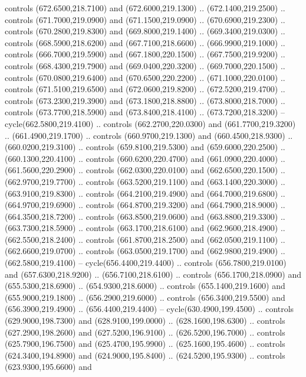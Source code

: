 {\begin{scope}[y=0.80pt, x=0.80pt, yscale=-1, xscale=1, inner sep=0pt, outer sep=0pt, #1]
      controls (672.6500,218.7100) and (672.6000,219.1300) .. (672.1400,219.2500) ..
      controls (671.7000,219.0900) and (671.1500,219.0900) .. (670.6900,219.2300) ..
      controls (670.2800,219.8300) and (669.8000,219.1400) .. (669.3400,219.0300) ..
      controls (668.5900,218.6200) and (667.7100,218.6600) .. (666.9900,219.1000) ..
      controls (666.7000,219.5900) and (667.1800,220.1500) .. (667.7500,219.9200) ..
      controls (668.4300,219.7900) and (669.0400,220.3200) .. (669.7000,220.1500) ..
      controls (670.0800,219.6400) and (670.6500,220.2200) .. (671.1000,220.0100) ..
      controls (671.5100,219.6500) and (672.0600,219.8200) .. (672.5200,219.4700) ..
      controls (673.2300,219.3900) and (673.1800,218.8800) .. (673.8000,218.7000) ..
      controls (673.7700,218.5900) and (673.8400,218.4100) .. (673.7200,218.3200) --
      cycle(662.5800,219.4100) .. controls (662.2700,220.0300) and
      (661.7700,219.3200) .. (661.4900,219.1700) .. controls (660.9700,219.1300) and
      (660.4500,218.9300) .. (660.0200,219.3100) .. controls (659.8100,219.5300) and
      (659.6000,220.2500) .. (660.1300,220.4100) .. controls (660.6200,220.4700) and
      (661.0900,220.4000) .. (661.5600,220.2900) .. controls (662.0300,220.0100) and
      (662.6500,220.1500) .. (662.9700,219.7700) .. controls (663.5200,219.1100) and
      (663.1400,220.3000) .. (663.9100,219.8300) .. controls (664.2100,219.4900) and
      (664.7000,219.6800) .. (664.9700,219.6900) .. controls (664.8700,219.3200) and
      (664.7900,218.9000) .. (664.3500,218.7200) .. controls (663.8500,219.0600) and
      (663.8800,219.3300) .. (663.7300,218.5900) .. controls (663.1700,218.6100) and
      (662.9600,218.4900) .. (662.5500,218.2400) .. controls (661.8700,218.2500) and
      (662.0500,219.1100) .. (662.6600,219.0700) .. controls (663.0500,219.1700) and
      (662.9800,219.4900) .. (662.5800,219.4100) -- cycle(656.4400,219.4400) ..
      controls (656.7800,219.0100) and (657.6300,218.9200) .. (656.7100,218.6100) ..
      controls (656.1700,218.0900) and (655.5300,218.6900) .. (654.9300,218.6000) ..
      controls (655.1400,219.1600) and (655.9000,219.1800) .. (656.2900,219.6000) ..
      controls (656.3400,219.5500) and (656.3900,219.4900) .. (656.4400,219.4400) --
      cycle(630.4900,199.4500) .. controls (629.9000,198.7300) and
      (628.9100,199.0000) .. (628.1600,198.6300) .. controls (627.2900,198.2600) and
      (627.5200,196.9100) .. (626.5200,196.7000) .. controls (625.7900,196.7500) and
      (625.4700,195.9900) .. (625.1600,195.4600) .. controls (624.3400,194.8900) and
      (624.9000,195.8400) .. (624.5200,195.9300) .. controls (623.9300,195.6600) and

\end{scope}}
